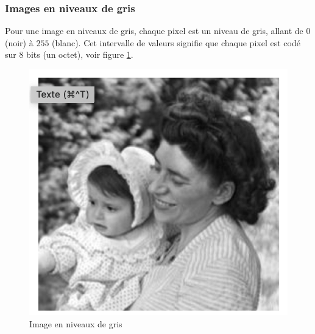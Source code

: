 \documentclass[a4paper,12pt]{report}
\begin{document}
\subsubsection{Images en niveaux de gris}
Pour une image en niveaux de gris, chaque pixel est un niveau de gris, allant de $0$ (noir) à $255$ (blanc). Cet intervalle de valeurs signifie que chaque pixel est codé sur $8$ bits (un octet), voir figure \ref{fig:ImageNivGris}. 
\begin{figure}[!ht]
	\centering
	\includegraphics[scale=0.5]{ImageNivGris}
	\caption{Image en niveaux de gris} \label{fig:ImageNivGris}
\end{figure}

\end{document}
